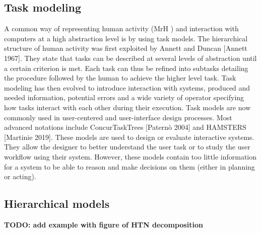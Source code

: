 \subsection{Task modeling}

A common way of representing human activity (MrH ) and interaction with computers at a high abstraction level is by using task models. The hierarchical structure of human activity was first exploited by Annett and Duncan [Annett 1967]. They state that tasks can be described at several levels of abstraction until a certain criterion is met. Each task can thus be refined into subtasks detailing the procedure followed by the human to achieve the higher level task. Task modeling has then evolved to introduce interaction with systems, produced and needed information, potential errors and a wide variety of operator specifying how tasks interact with each other during their execution. Task models are now commonly used in user-centered and user-interface design processes. Most advanced notations include ConcurTaskTrees [Paternò 2004] and HAMSTERS [Martinie 2019]. These models are used to design or evaluate interactive systems. They allow the designer to better understand the user task or to study the user workflow using their system. However, these models contain too little information for a system to be able to reason and make decisions on them (either in planning or acting).


\subsection{Hierarchical models}

\textbf{TODO: add example with figure of HTN decomposition}

